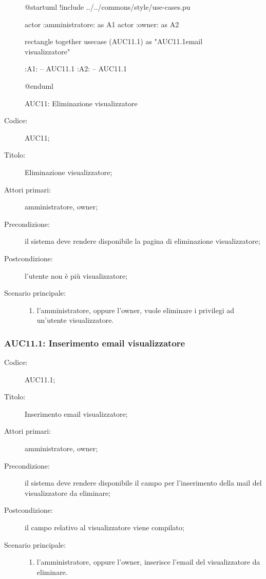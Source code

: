 \documentclass[../../../analisi-dei-requisiti.tex]{subfiles}
\begin{document}
\begin{figure}[H]
  \centering
  \begin{plantuml}
    @startuml
    !include ../../commons/style/use-cases.pu

    actor :amministratore: as A1
    actor :owner: as A2

    rectangle {
        together {
            usecase (AUC11.1) as "AUC11.1\nInserimento email visualizzatore"
          }
      }

    :A1: -- AUC11.1
    :A2: -- AUC11.1

    @enduml
  \end{plantuml}
  \caption{AUC11: Eliminazione visualizzatore}%
  \label{fig:AUC11}
\end{figure}

\begin{description}
  \item[Codice:] AUC11;
  \item[Titolo:] Eliminazione visualizzatore;
  \item[Attori primari:] amministratore, owner;
  \item[Precondizione:] il sistema deve rendere disponibile la pagina di eliminazione visualizzatore;
  \item[Postcondizione:] l'utente non è più visualizzatore;
  \item[Scenario principale:]
        \begin{enumerate}
          \item l'amministratore, oppure l'owner, vuole eliminare i privilegi ad un'utente visualizzatore.
        \end{enumerate}
\end{description}

\subsubsection{AUC11.1: Inserimento email visualizzatore}%
\label{subs:AUC11.1}
\begin{description}
  \item[Codice:] AUC11.1;
  \item[Titolo:] Inserimento email visualizzatore;
  \item[Attori primari:] amministratore, owner;
  \item[Precondizione:] il sistema deve rendere disponibile il campo per l'inserimento della mail del visualizzatore da eliminare;
  \item[Postcondizione:] il campo relativo al visualizzatore viene compilato;
  \item[Scenario principale:]
        \begin{enumerate}
          \item l'amministratore, oppure l'owner, inserisce l'email del visualizzatore da eliminare.
        \end{enumerate}
\end{description}
\end{document}
